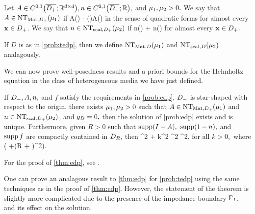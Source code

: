 
  
\label{def:NT}
Let $A \in \CzoDpclosRRdtd, n \in \CzoDpclosRR,$ and $\mu_{1}, \mu_{2} > 0.$ We say that $A \in \NTADp{\muo}$ if
\beqs
A(\bx) - \mleft(\bx \cdot \grad\mright)A(\bx) \geq \muo
\eeqs
in the sense of quadratic forms for almost every $\mathbf{x} \in D_{+}$. We say that $n \in \NTnDp{\mut}$ if
\beqs
n(\bx) + \bx \cdot \grad n(\bx) \geq \mut
\eeqs
for almost every $\mathbf{x} \in D_{+}.$

If $D$ is as in \cref{prob:tedp}, then we define $\NTAD{\muo}$ and $\NTnD{\mut}$ analagously.
\ede
{}

We can now prove well-posedness results and a priori bounds for the Helmholtz equation in the class of heterogeneous media we have just defined.

\label{thm:edp}
If $D_{-}, A, n,$ and $f$ satisfy the requirements in \cref{prob:edp}, $D_{-}$ is star-shaped with respect to the origin, there exists $\mu_{1}, \mu_{2} > 0$ such that $A \in \NTADp{\muo}$ and $n \in \NTnDp{\mut}$, and $g_{D} = 0,$ then the solution of \cref{prob:edp} exists and is unique. Furthermore, given $R>0$ such that $\supp\mleft(I-A\mright),$ $\operatorname{supp}(1-n),$ and $\operatorname{supp} f$ are compactly contained in $D_{R},$ then
\beqs
\muo {}^2 + \mut k^2 ^2 \leq \Co {}^2,
\eeqs
for all $k>0,$ where
\beqs
\Co {}\mleft( +\mleft(R + \mright)^2\mright).
\eeqs
\enth

For the proof of \cref{thm:edp}, see \cite[Theorem 2.5]{GrPeSp:19}.

One can prove an analagous result to \cref{thm:edp} for \cref{prob:tedp} using the same techniques as in the proof of \cref{thm:edp}. However, the statement of the theorem is slightly more complicated due to the presence of the impedance boundary $\Gamma_{I}$, and its effect on the solution.

